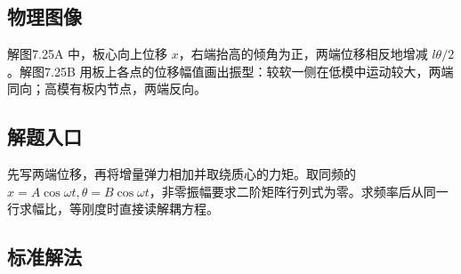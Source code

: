 \documentclass[UTF8,fontset=fandol,a4paper,11pt]{ctexart}
\begin{document}

\subsection*{物理图像}

解图7.25A 中，板心向上位移 $x$，右端抬高的倾角为正，两端位移相反地增减 $l\theta/2$。解图7.25B 用板上各点的位移幅值画出振型：较软一侧在低模中运动较大，两端同向；高模有板内节点，两端反向。




\subsection*{解题入口}

先写两端位移，再将增量弹力相加并取绕质心的力矩。取同频的 $x=A\cos\omega t,\theta=B\cos\omega t$，非零振幅要求二阶矩阵行列式为零。求频率后从同一行求幅比，等刚度时直接读解耦方程。



\subsection*{标准解法}
\end{document}
